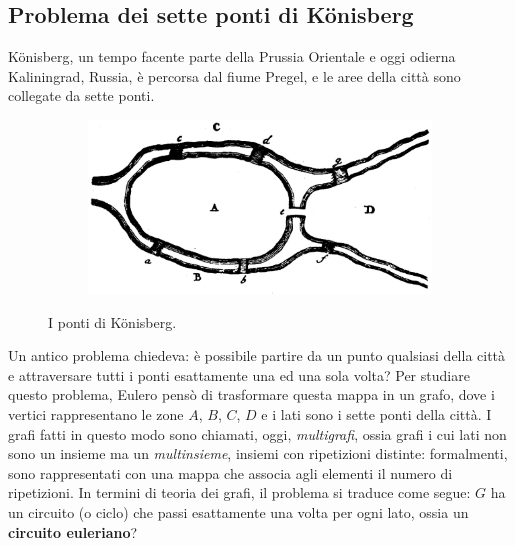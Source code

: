\subsection{Problema dei sette ponti di Könisberg}
K\"onisberg, un tempo facente parte della Prussia Orientale e oggi odierna
Kaliningrad, Russia, è percorsa dal fiume Pregel, e le aree della città
sono collegate da sette ponti.
\begin{figure}[h]
	\centering
	\begin{subfigure}[b]{0.45\textwidth}
		\centering
		\includegraphics[width=\textwidth]{img/konigsberg.png}
	\end{subfigure}
	\begin{subfigure}[b]{0.45\textwidth}
		\centering
	\end{subfigure}
	\caption{I ponti di Könisberg.}
	\label{fig:ponti_konigsberg}
\end{figure}

Un antico problema chiedeva: è possibile partire da un punto qualsiasi della
città e attraversare tutti i ponti esattamente una ed una sola volta?
Per studiare questo problema, Eulero pensò di trasformare questa mappa in un
grafo, dove i vertici rappresentano le zone $A$, $B$, $C$, $D$ e i lati
sono i sette ponti della città. I grafi fatti in questo modo sono chiamati, oggi,
\textit{multigrafi}, ossia grafi i cui lati non sono un insieme ma un \textit{multinsieme},
insiemi con ripetizioni distinte: formalmenti, sono rappresentati con una mappa
che associa agli elementi il numero di ripetizioni. In termini di teoria dei
grafi, il problema si traduce come segue: $G$ ha un circuito (o ciclo)  che
passi esattamente una volta per ogni lato, ossia un \textbf{circuito euleriano}?

